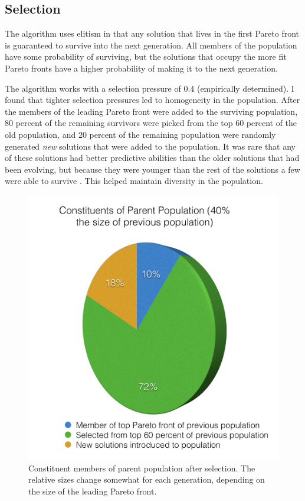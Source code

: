 \documentclass{acm_proc_article-sp}
\begin{document}
\subsection{Selection}
The algorithm uses elitism in that any solution that lives in the first Pareto front is guaranteed to survive into the next generation. All members of the population have some probability of surviving, but the solutions that occupy the more fit Pareto fronts have a higher probability of making it to the next generation.

The algorithm works with a selection pressure of 0.4 (empirically determined). I found that tighter selection pressures led to homogeneity in the population. After the members of the leading Pareto front were added to the surviving population, 80 percent of the remaining survivors were picked from the top 60 percent of the old population, and 20 percent of the remaining population were randomly generated {\it{new}} solutions that were added to the population. It was rare that any of these solutions had better predictive abilities than the older solutions that had been evolving, but because they were younger than the rest of the solutions a few were able to survive \cite{class}. This helped maintain diversity in the population.

\begin{figure}[!h]
\center
\includegraphics[scale=0.3]{Parent_Plot.png}
\caption {Constituent members of parent population after selection. The relative sizes change somewhat for each generation, depending on the size of the leading Pareto front.}
\label{fig:bullet}
\end{figure}
\end{document}
